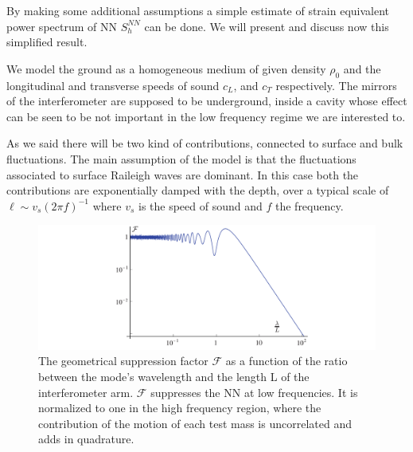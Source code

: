 By making some additional assumptions a simple estimate of strain equivalent
power spectrum of NN $S_{h}^{NN}$ can be done. We will present and discuss now
this simplified result.

We model the ground as a homogeneous medium of given density $\rho_{0}$ and
the longitudinal and transverse speeds of sound $c_{L}$, and $c_{T}$
respectively. The mirrors of the interferometer are supposed to be
underground, inside a cavity whose effect can be seen to be not important in
the low frequency regime we are interested to.

As we said there will be two kind of contributions, connected to surface and
bulk fluctuations. The main assumption of the model is that the fluctuations
associated to surface Raileigh waves are dominant. In this case both the
contributions are exponentially damped with the depth, over a typical scale of
$\ell \sim v_s (2\pi f)^{-1}$ where $v_s$ is the speed of sound and $f$
the frequency.

\begin{figure}[t!]
	\begin{center} \includegraphics[width=16cm]{./Sec_SiteInfra/Figures/GeometricFactor.pdf} \caption{The
		geometrical suppression factor $\mathcal{F}$ as a function of
		the ratio between the mode's wavelength and the length L of
		the interferometer arm. $\mathcal{F}$ suppresses the NN at low
		frequencies. It is normalized to one in the high frequency
		region, where the contribution of the motion of each test mass
		is uncorrelated and adds in
		quadrature.}  \label{fig3.7} \end{center}
\end{figure}


